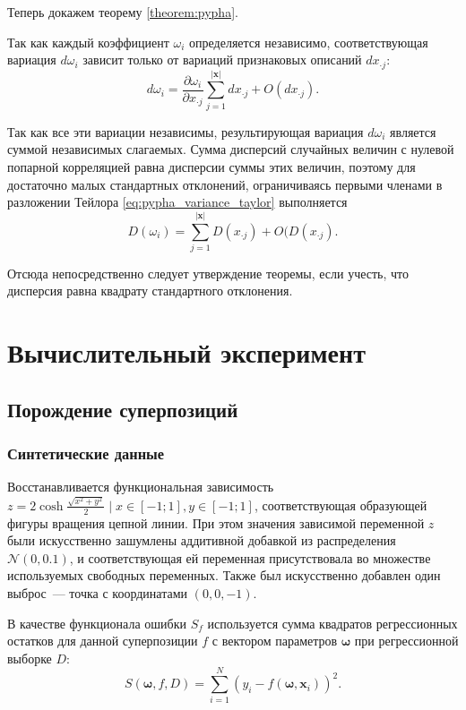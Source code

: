 \documentclass[12pt,a4paper]{article}
\begin{document}
Теперь докажем теорему \ref{theorem:pypha}.
\begin{Proof}
  Так как каждый коэффициент $\omega_i$ определяется независимо, соответствующая
  вариация $d \omega_i$ зависит только от вариаций признаковых описаний
  $d x_{\cdot j}$:
  \begin{equation}
    d \omega_i = \frac{\partial \omega_i}{\partial x_{\cdot j}} \sum_{j = 1}^{|\mathbf{x}|} d x_{\cdot j} + O(d x_{\cdot j}).
    \label{eq:pypha_variance_taylor}
  \end{equation}
  
  Так как все эти вариации независимы, результирующая вариация $d\omega_i$ является
  суммой независимых слагаемых. Сумма дисперсий
  случайных величин с нулевой попарной корреляцией равна дисперсии
  суммы этих величин, поэтому для достаточно малых стандартных отклонений,
  ограничиваясь первыми членами в разложении Тейлора \eqref{eq:pypha_variance_taylor}
  выполняется
  \[
    D(\omega_i) = \sum_{j = 1}^{|\mathbf{x}|} D(x_{\cdot j}) + O(D (x_{\cdot j}).
  \]
  
  Отсюда непосредственно следует утверждение теоремы, если учесть, что
  дисперсия равна квадрату стандартного отклонения.
\end{Proof}

\section{Вычислительный эксперимент}

\subsection{Порождение суперпозиций}

\subsubsection{Синтетические данные}
Восстанавливается функциональная зависимость
$z = 2 \cosh \frac{\sqrt{x^2 + y^2}}{2} \mid x \in [-1; 1], y \in [-1; 1]$,
соответствующая образующей фигуры вращения цепной линии. При этом значения зависимой
переменной $z$ были искусственно зашумлены аддитивной добавкой из
распределения $\mathcal{N} (0, 0.1)$, и соответствующая ей переменная
присутствовала во множестве используемых свободных переменных.
Также был искусственно добавлен один
выброс~--- точка с координатами $(0, 0, -1)$.

В качестве функционала ошибки $S_f$ используется сумма квадратов
регрессионных остатков для данной суперпозиции $f$ с вектором параметров
$\boldsymbol{\omega}$ при регрессионной выборке $D$:
\begin{equation}
  \label{eq:sse_expr}
  S(\boldsymbol{\omega}, f, D) = \sum_{i=1}^N (y_i - f (\boldsymbol{\omega}, \mathbf{x}_i))^2.
\end{equation}
\end{document}
